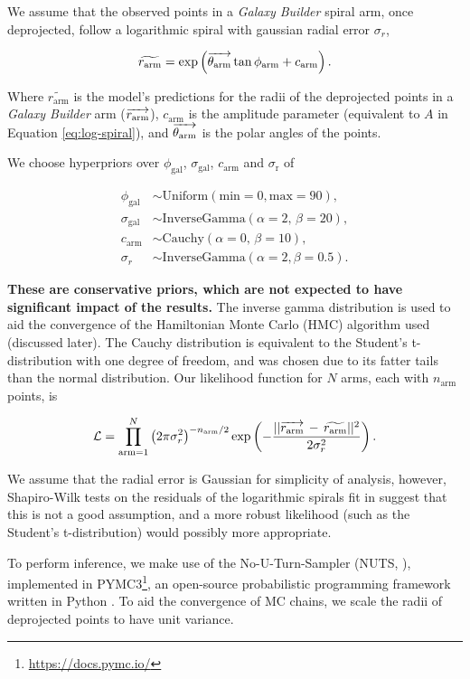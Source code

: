 We assume that the observed points in a \textit{Galaxy Builder} spiral arm, once deprojected, follow a logarithmic spiral with gaussian radial error $\sigma_r$,

\begin{equation}
\widetilde{r_\mathrm{arm}} = \exp\left(\overrightarrow{\theta_\mathrm{arm}}\tan\phi_\mathrm{arm} + c_\mathrm{arm}\right).
\end{equation}

Where $\widetilde{r_\mathrm{arm}}$ is the model's predictions for the radii of the deprojected points in a \textit{Galaxy Builder} arm ($\overrightarrow{r_\mathrm{arm}}$), $c_\mathrm{arm}$ is the amplitude parameter (equivalent to $A$ in Equation \ref{eq:log-spiral}), and $\overrightarrow{\theta_\mathrm{arm}}$ is the polar angles of the points.

We choose hyperpriors over $\phi_\mathrm{gal}$, $\sigma_\mathrm{gal}$, $c_\mathrm{arm}$ and $\sigma_\mathrm{r}$ of

\begin{align}
  \phi_\mathrm{gal} &\sim \mathrm{Uniform}(\mathrm{min}=0, \mathrm{max}=90),\\
  \sigma_\mathrm{gal} &\sim \mathrm{InverseGamma}(\alpha=2,\,\beta=20),\\
  c_\mathrm{arm} &\sim \mathrm{Cauchy}(\alpha=0,\,\beta=10),\\
  \sigma_r &\sim \mathrm{InverseGamma}(\alpha=2, \beta=0.5).
\end{align}

\textbf{These are conservative priors, which are not expected to have significant impact of the results.} The inverse gamma distribution is used to aid the convergence of the Hamiltonian Monte Carlo (HMC) algorithm used (discussed later). The Cauchy distribution is equivalent to the Student's t-distribution with one degree of freedom, and was chosen due to its fatter tails than the normal distribution. Our likelihood function for $N$ arms, each with $n_\mathrm{arm}$ points, is

\begin{equation}
  \mathcal{L} = \prod_{\mathrm{arm}=1}^{N}\left(2\pi\sigma_r^2\right)^{-n_\mathrm{arm}/2}
  \exp\left(-\frac{||\overrightarrow{r_\mathrm{arm}}\,-\,\widetilde{r_\mathrm{arm}}||^2}{2\sigma_r^2}\right).
\end{equation}

We assume that the radial error is Gaussian for simplicity of analysis, however, Shapiro-Wilk tests on the residuals of the logarithmic spirals fit in \citet{2020arXiv200610450L} suggest that this is not a good assumption, and a more robust likelihood (such as the Student's t-distribution) would possibly more appropriate.

To perform inference, we make use of the No-U-Turn-Sampler (NUTS, \citealt{2011arXiv1111.4246H}), implemented in PYMC3\footnote{\url{https://docs.pymc.io/}}, an open-source probabilistic programming framework written in Python \citep{pymc3_paper}. To aid the convergence of MC chains, we scale the radii of deprojected points to have unit variance.

